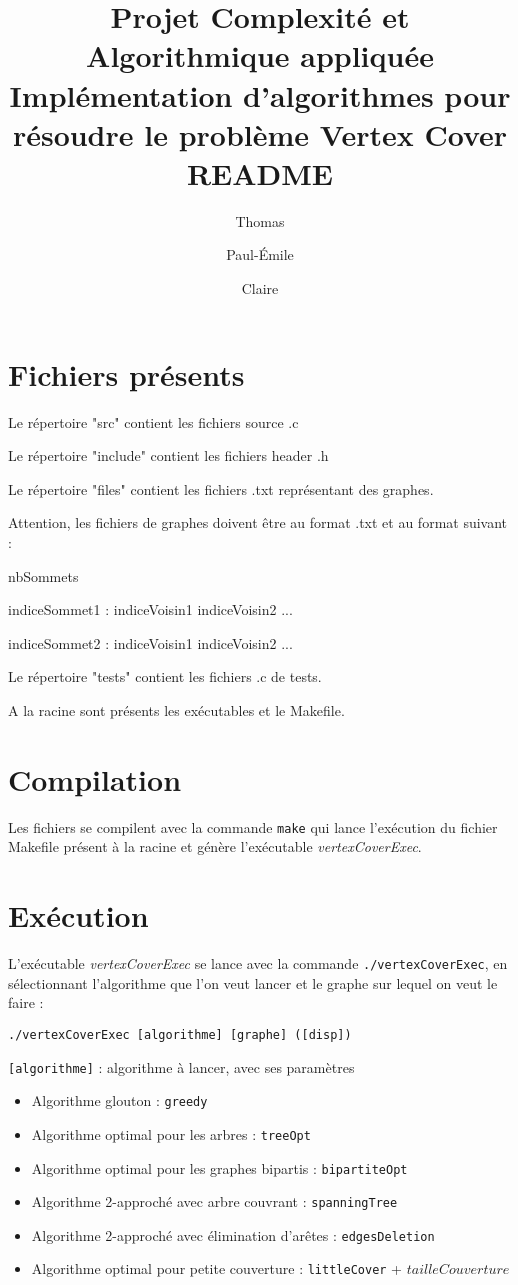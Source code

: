 \documentclass[a4paper,10pt]{article}
\title{Projet Complexité et Algorithmique appliquée\\ Implémentation d'algorithmes pour résoudre le problème Vertex Cover \\
README}
\author{Thomas \bsc{Bellitto}\and Paul-Émile \bsc{Boutoille} \and Claire \bsc{Pennarun}}
\date{}
\begin{document}
\maketitle
\section{Fichiers présents}

	Le répertoire "src" contient les fichiers source .c
	
	Le répertoire "include" contient les fichiers header .h
	
	Le répertoire "files" contient les fichiers .txt représentant des graphes.
	
	Attention, les fichiers de graphes doivent être au format .txt et au format suivant :

	nbSommets
	
	indiceSommet1 : indiceVoisin1 indiceVoisin2 ...
	
	indiceSommet2 : indiceVoisin1 indiceVoisin2 ...
	
	Le répertoire "tests" contient les fichiers .c de tests.
	
	A la racine sont présents les exécutables et le Makefile.


\section{Compilation}

	Les fichiers se compilent avec la commande \texttt{make} qui lance l'exécution du fichier Makefile présent à la racine et génère l'exécutable \textit{vertexCoverExec}.


\section{Exécution}

	L'exécutable \textit{vertexCoverExec} se lance avec la commande \texttt{./vertexCoverExec}, en sélectionnant l'algorithme que l'on veut lancer et le graphe sur lequel on veut le faire :
	
	\bigskip
	\texttt{./vertexCoverExec [algorithme] [graphe] ([disp])}

	\bigskip
	\texttt{[algorithme]} : algorithme à lancer, avec ses paramètres
	\begin{itemize}
		\item Algorithme glouton : \texttt{greedy}
		\item Algorithme optimal pour les arbres : \texttt{treeOpt}
		\item Algorithme optimal pour les graphes bipartis : \texttt{bipartiteOpt}
		\item Algorithme 2-approché avec arbre couvrant : \texttt{spanningTree}
		\item Algorithme 2-approché avec élimination d'arêtes : \texttt{edgesDeletion}
		\item Algorithme optimal pour petite couverture : \texttt{littleCover} + $tailleCouverture$
	\end{itemize}
	
\end{document}
